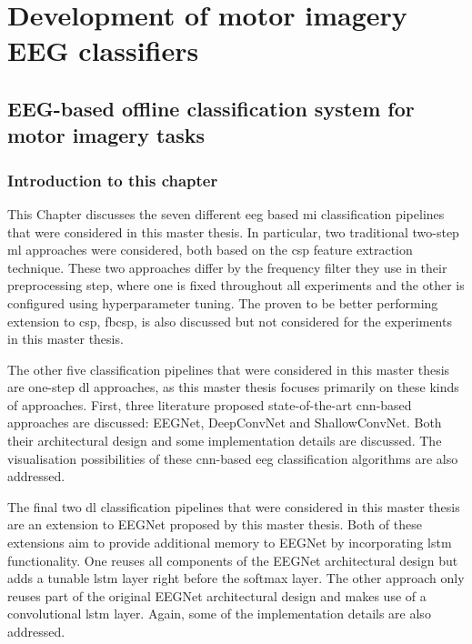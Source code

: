

\part{Development of motor imagery EEG classifiers}
\label{part:development}

\chapter{EEG-based offline classification system for motor imagery tasks}
\label{ch:offline_bci_system}

\section{Introduction to this chapter}
\label{sec:offline_bci_system_introduction}

This Chapter discusses the seven different \gls{eeg} based \gls{mi} classification pipelines that were considered in this master thesis.
In particular, two traditional two-step \gls{ml} approaches were considered, both based on the \gls{csp} feature extraction technique.
These two approaches differ by the frequency filter they use in their preprocessing step, where one is fixed throughout all experiments and the other is configured using hyperparameter tuning.
The proven to be better performing extension to \gls{csp}, \gls{fbcsp}, is also discussed but not considered for the experiments in this master thesis.

The other five classification pipelines that were considered in this master thesis are one-step \gls{dl} approaches, as this master thesis focuses primarily on these kinds of approaches.
First, three literature proposed state-of-the-art \gls{cnn}-based approaches are discussed: EEGNet, Deep\-Conv\-Net and ShallowConvNet.
Both their architectural design and some implementation details are discussed.
The visualisation possibilities of these \gls{cnn}-based \gls{eeg} classification algorithms are also addressed.

The final two \gls{dl} classification pipelines that were considered in this master thesis are an extension to EEGNet proposed by this master thesis.
Both of these extensions aim to provide additional memory to EEGNet by incorporating \gls{lstm} functionality. 
One reuses all components of the EEGNet architectural design but adds a tunable \gls{lstm} layer right before the softmax layer.
The other approach only reuses part of the original EEGNet architectural design and makes use of a convolutional \gls{lstm} layer.
Again, some of the implementation details are also addressed.

